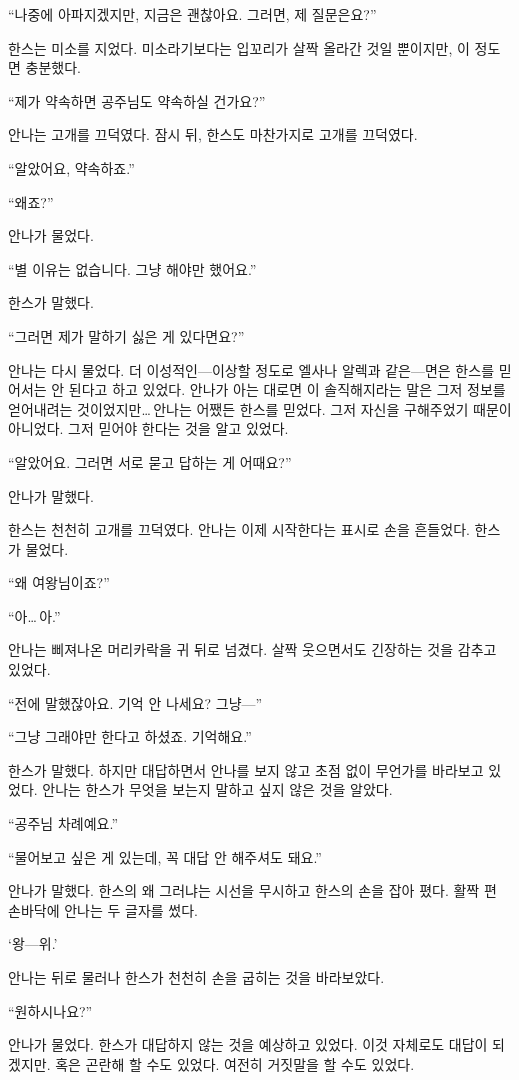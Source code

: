 ``나중에 아파지겠지만, 지금은 괜찮아요. 그러면, 제 질문은요?''

한스는 미소를 지었다. 미소라기보다는 입꼬리가 살짝 올라간 것일 뿐이지만, 이 정도면 충분했다.

``제가 약속하면 공주님도 약속하실 건가요?''

안나는 고개를 끄덕였다. 잠시 뒤, 한스도 마찬가지로 고개를 끄덕였다.

``알았어요, 약속하죠.''

``왜죠?''

안나가 물었다.

``별 이유는 없습니다. 그냥 해야만 했어요.''

한스가 말했다.

``그러면 제가 말하기 싫은 게 있다면요?''

안나는 다시 물었다. 더 이성적인—이상할 정도로 엘사나 알렉과 같은—면은 한스를 믿어서는 안 된다고 하고 있었다. 안나가 아는 대로면 이 솔직해지라는 말은 그저 정보를 얻어내려는 것이었지만\ldots\,안나는 어쨌든 한스를 믿었다. 그저 자신을 구해주었기 때문이 아니었다. 그저 믿어야 한다는 것을 알고 있었다.

``알았어요. 그러면 서로 묻고 답하는 게 어때요?''

안나가 말했다.

한스는 천천히 고개를 끄덕였다. 안나는 이제 시작한다는 표시로 손을 흔들었다. 한스가 물었다.

``왜 여왕님이죠?''

``아\ldots\,아.''

안나는 삐져나온 머리카락을 귀 뒤로 넘겼다. 살짝 웃으면서도 긴장하는 것을 감추고 있었다.

``전에 말했잖아요. 기억 안 나세요? 그냥—''

``그냥 그래야만 한다고 하셨죠. 기억해요.''

한스가 말했다. 하지만 대답하면서 안나를 보지 않고 초점 없이 무언가를 바라보고 있었다. 안나는 한스가 무엇을 보는지 말하고 싶지 않은 것을 알았다.

``공주님 차례예요.''

``물어보고 싶은 게 있는데, 꼭 대답 안 해주셔도 돼요.''

안나가 말했다. 한스의 왜 그러냐는 시선을 무시하고 한스의 손을 잡아 폈다. 활짝 편 손바닥에 안나는 두 글자를 썼다.

`왕—위.'

안나는 뒤로 물러나 한스가 천천히 손을 굽히는 것을 바라보았다.

``원하시나요?''

안나가 물었다. 한스가 대답하지 않는 것을 예상하고 있었다. 이것 자체로도 대답이 되겠지만. 혹은 곤란해 할 수도 있었다. 여전히 거짓말을 할 수도 있었다.

